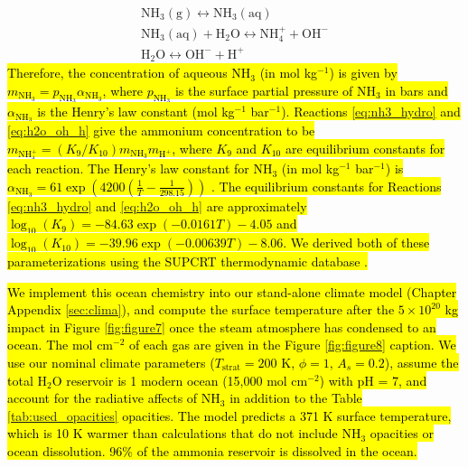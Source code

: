 \begin{gather}
  \mathrm{NH_3(g)} \leftrightarrow \mathrm{NH_3(aq)} \\
  \mathrm{NH_3(aq)} + \mathrm{H_2O} \leftrightarrow \mathrm{NH_4^+} + \mathrm{OH^-} \label{eq:nh3_hydro} \\
  \mathrm{H_2O} \leftrightarrow \mathrm{OH^-} + \mathrm{H^+} \label{eq:h2o_oh_h}
\end{gather}
\hl{Therefore, the concentration of aqueous NH$_3$ (in mol kg$^{-1}$) is given by $m_\mathrm{NH_3} = p_\mathrm{NH_3} \alpha_\mathrm{NH_3}$, where $p_\mathrm{NH_3}$ is the surface partial pressure of NH$_3$ in bars and $\alpha_\mathrm{NH_3}$ is the Henry's law constant (mol kg$^{-1}$ bar$^{-1}$). Reactions \mbox{\ref{eq:nh3_hydro}} and \mbox{\ref{eq:h2o_oh_h}} give the ammonium concentration to be $m_\mathrm{NH_4^+} = (K_9/K_{10}) m_\mathrm{NH_3} m_\mathrm{H^+}$, where $K_9$ and $K_{10}$ are equilibrium constants for each reaction. The Henry's law constant for NH$_3$ (in mol kg$^{-1}$ bar$^{-1}$) is $\alpha_\mathrm{NH_3} = 61 \exp(4200 (\frac{1}{T} - \frac{1}{298.15}))$ \mbox{\citep{Linstrom_1998}}. The equilibrium constants for Reactions \mbox{\ref{eq:nh3_hydro}} and \mbox{\ref{eq:h2o_oh_h}} are approximately $\log_{10}(K_9) = - 84.63 \exp(- 0.0161 T) - 4.05$ and $\log_{10}(K_{10}) = - 39.96 \exp(- 0.00639 T) - 8.06$. We derived both of these parameterizations using the SUPCRT thermodynamic database \mbox{\citep{Johnson_1992}}.}

\hl{We implement this ocean chemistry into our stand-alone climate model (Chapter Appendix \mbox{\ref{sec:clima}}), and compute the surface temperature after the $5 \times 10^{20}$ kg impact in Figure \mbox{\ref{fig:figure7}} once the steam atmosphere has condensed to an ocean. The mol cm$^{-2}$ of each gas are given in the Figure \mbox{\ref{fig:figure8}} caption. We use our nominal climate parameters ($T_\mathrm{strat} = 200$ K, $\phi = 1$, $A_s = 0.2$), assume the total H$_2$O reservoir is 1 modern ocean (15,000 mol cm$^{-2}$) with pH = 7, and account for the radiative affects of NH$_3$ in addition to the Table \mbox{\ref{tab:used_opacities}} opacities. The model predicts a 371 K surface temperature, which is 10 K warmer than calculations that do not include NH$_3$ opacities or ocean dissolution. 96\% of the ammonia reservoir is dissolved in the ocean.}

